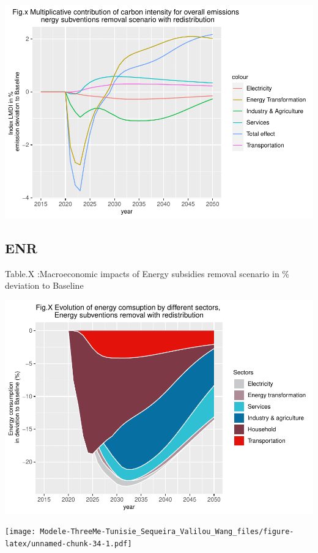 \documentclass[
]{article}
\begin{document}
\includegraphics{Modele-ThreeMe-Tunisie_Sequeira_Valilou_Wang_files/figure-latex/unnamed-chunk-32-1.pdf}

\hypertarget{enr-1}{%
\subsection{ENR}\label{enr-1}}

Table.X :Macroeconomic impacts of Energy subsidies removal scenario in
\% deviation to Baseline

\includegraphics{Modele-ThreeMe-Tunisie_Sequeira_Valilou_Wang_files/figure-latex/unnamed-chunk-33-1.pdf}

\texttt{[image: Modele-ThreeMe-Tunisie\_Sequeira\_Valilou\_Wang\_files/figure-latex/unnamed-chunk-34-1.pdf]}
\end{document}
